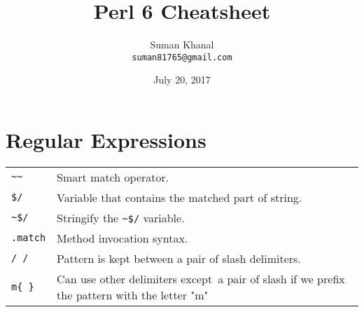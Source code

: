 \documentclass{article}
\title{\huge\textbf{Perl 6 Cheatsheet}}
\author{Suman Khanal\\ \verb!suman81765@gmail.com! }
\date{July 20, 2017}
\begin{document}
	\maketitle
	
	\section{Regular Expressions}
	\begin{tabular}{@{}ll@{}}
		\verb!~~!    & Smart match operator. \\
		\verb!$/!  & Variable that contains the matched part of string. \\
		\verb!~$/! & Stringify the \verb!~$/! variable. \\
		\verb!.match!  & Method invocation syntax. \\
		\verb!/ /!  & Pattern is kept between a pair of slash delimiters.\\
		\verb|m{ }|	& Can use other delimiters except\ a pair of slash if we prefix the pattern with the letter "m"\\
		
	\end{tabular}
	
	
	
	
	
	
	
	
\end{document}
